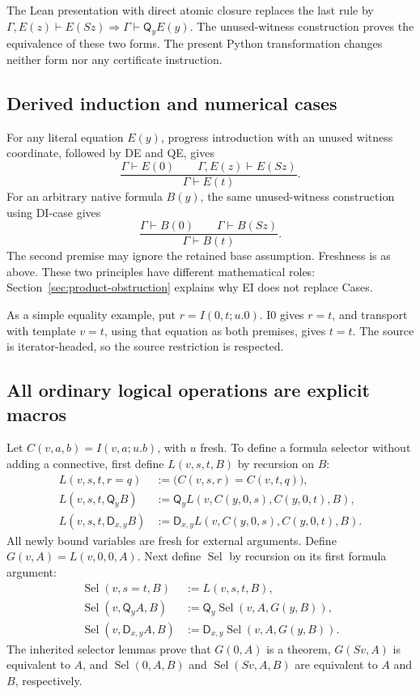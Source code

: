\documentclass[11pt]{article}
\theoremstyle{definition}\newtheorem{definition}[theorem]{Definition}
\theoremstyle{remark}\newtheorem{remark}[theorem]{Remark}
\newcommand{\Q}{\mathsf Q}
\newcommand{\D}{\mathsf D}
\begin{document}
The Lean presentation with direct atomic closure replaces the last rule
by $\Gamma,E(z)\vdash E(Sz)\Rightarrow\Gamma\vdash\Q_yE(y)$.
The unused-witness construction proves the equivalence of these two
forms. The present Python transformation changes neither form nor any
certificate instruction.

\subsection{Derived induction and numerical cases}

For any literal equation $E(y)$, progress introduction with an unused
witness coordinate, followed by DE and QE, gives
\[
 \frac{\Gamma\vdash E(0)\qquad\Gamma,E(z)\vdash E(Sz)}
      {\Gamma\vdash E(t)}.
 \tag{EI}
\]
For an arbitrary native formula $B(y)$, the same unused-witness
construction using DI-case gives
\[
 \frac{\Gamma\vdash B(0)\qquad\Gamma\vdash B(Sz)}
      {\Gamma\vdash B(t)}.
 \tag{Cases}
\]
The second premise may ignore the retained base assumption. Freshness is
as above. These two principles have different mathematical roles:
Section~\ref{sec:product-obstruction} explains why EI does not replace Cases.

As a simple equality example, put $r=I(0,t;u.0)$. I0 gives $r=t$,
and transport with template $v=t$, using that equation as both premises,
gives $t=t$. The source is iterator-headed, so the source restriction is
respected.

\subsection{All ordinary logical operations are explicit macros}

Let $C(v,a,b)=I(v,a;u.b)$, with $u$ fresh. To define a formula selector
without adding a connective, first define $L(v,s,t,B)$ by recursion on $B$:
\begin{align*}
 L(v,s,t,r=q)&:=\bigl(C(v,s,r)=C(v,t,q)\bigr),\\
 L(v,s,t,\Q_yB)&:=\Q_y L(v,C(y,0,s),C(y,0,t),B),\\
 L(v,s,t,\D_{x,y}B)&:=\D_{x,y}L(v,C(y,0,s),C(y,0,t),B).
\end{align*}
All newly bound variables are fresh for external arguments. Define
$G(v,A)=L(v,0,0,A)$. Next define $\operatorname{Sel}$ by recursion on its
first formula argument:
\begin{align*}
 \operatorname{Sel}(v,s=t,B)&:=L(v,s,t,B),\\
 \operatorname{Sel}(v,\Q_yA,B)&:=\Q_y\operatorname{Sel}(v,A,G(y,B)),\\
 \operatorname{Sel}(v,\D_{x,y}A,B)&:=\D_{x,y}\operatorname{Sel}(v,A,G(y,B)).
\end{align*}
The inherited selector lemmas prove that $G(0,A)$ is a theorem,
$G(Sv,A)$ is equivalent to $A$, and $\operatorname{Sel}(0,A,B)$ and
$\operatorname{Sel}(Sv,A,B)$ are equivalent to $A$ and $B$, respectively.
\end{document}
